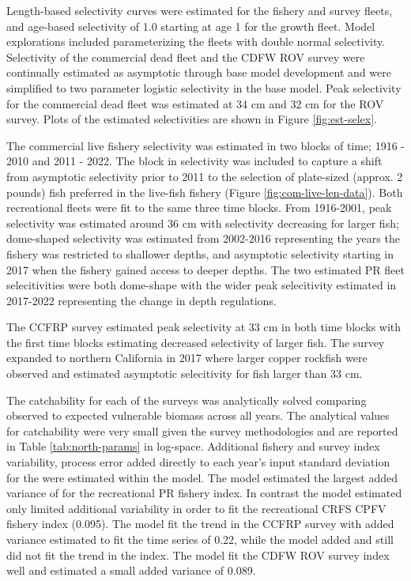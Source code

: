 \documentclass[11pt,
  english,
  letterpaper,
]{article}
\begin{document}
Length-based selectivity curves were estimated for the fishery and survey fleets, and age-based selectivity of 1.0 starting at age 1 for the growth fleet. Model explorations included parameterizing the fleets with double normal selectivity. Selectivity of the commercial dead fleet and the CDFW ROV survey were continually estimated as asymptotic through base model development and were simplified to two parameter logistic selectivity in the base model. Peak selectivity for the commercial dead fleet was estimated at 34 cm and 32 cm for the ROV survey. Plots of the estimated selectivities are shown in Figure \ref{fig:est-selex}.

The commercial live fishery selectivity was estimated in two blocks of time; 1916 - 2010 and 2011 - 2022. The block in selectivity was included to capture a shift from asymptotic selectivity prior to 2011 to the selection of plate-sized (approx. 2 pounds) fish preferred in the live-fish fishery (Figure \ref{fig:com-live-len-data}). Both recreational fleets were fit to the same three time blocks. From 1916-2001, peak selectivity was estimated around 36 cm with selectivity decreasing for larger fish; dome-shaped selectivity was estimated from 2002-2016 representing the years the fishery was restricted to shallower depths, and asymptotic selectivity starting in 2017 when the fishery gained access to deeper depths. The two estimated PR fleet selecitivities were both dome-shape with the wider peak selecitivity estimated in 2017-2022 representing the change in depth regulations.

The CCFRP survey estimated peak selectivity at 33 cm in both time blocks with the first time blocks estimating decreased selectivity of larger fish. The survey expanded to northern California in 2017 where larger copper rockfish were observed and estimated asymptotic selecitivity for fish larger than 33 cm.

The catchability for each of the surveys was analytically solved comparing observed to expected vulnerable biomass across all years. The analytical values for catchability were very small given the survey methodologies and are reported in Table \ref{tab:north-params} in log-space. Additional fishery and survey index variability, process error added directly to each year's input standard deviation for the were estimated within the model. The model estimated the largest added variance of for the recreational PR fishery index. In contrast the model estimated only limited additional variability in order to fit the recreational CRFS CPFV fishery index (0.095). The model fit the trend in the CCFRP survey with added variance estimated to fit the time series of 0.22, while the model added and still did not fit the trend in the index. The model fit the CDFW ROV survey index well and estimated a small added variance of 0.089.
\end{document}
